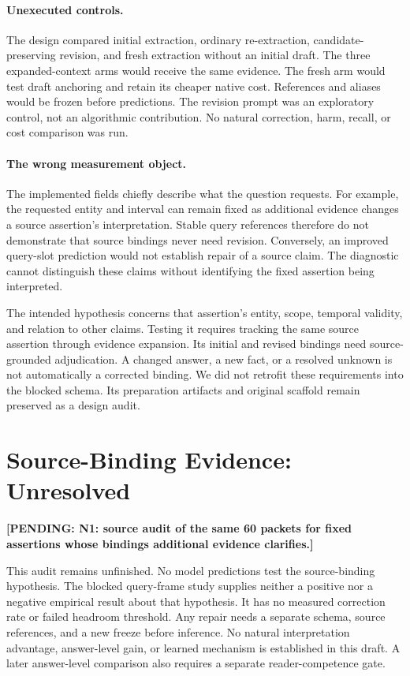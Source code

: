 \documentclass[11pt]{article}
\newcommand{\pending}[1]{\textbf{[PENDING: #1]}}
\begin{document}
\paragraph{Unexecuted controls.}
The design compared initial extraction, ordinary re-extraction, candidate-preserving revision, and fresh extraction without an initial draft.
The three expanded-context arms would receive the same evidence.
The fresh arm would test draft anchoring and retain its cheaper native cost.
References and aliases would be frozen before predictions.
The revision prompt was an exploratory control, not an algorithmic contribution.
No natural correction, harm, recall, or cost comparison was run.

\paragraph{The wrong measurement object.}
The implemented fields chiefly describe what the question requests.
For example, the requested entity and interval can remain fixed as additional evidence changes a source assertion's interpretation.
Stable query references therefore do not demonstrate that source bindings never need revision.
Conversely, an improved query-slot prediction would not establish repair of a source claim.
The diagnostic cannot distinguish these claims without identifying the fixed assertion being interpreted.

The intended hypothesis concerns that assertion's entity, scope, temporal validity, and relation to other claims.
Testing it requires tracking the same source assertion through evidence expansion.
Its initial and revised bindings need source-grounded adjudication.
A changed answer, a new fact, or a resolved unknown is not automatically a corrected binding.
We did not retrofit these requirements into the blocked schema.
Its preparation artifacts and original scaffold remain preserved as a design audit.

\section{Source-Binding Evidence: Unresolved}
\label{sec:pending}

\pending{N1: source audit of the same 60 packets for fixed assertions whose bindings additional evidence clarifies.}

This audit remains unfinished.
No model predictions test the source-binding hypothesis.
The blocked query-frame study supplies neither a positive nor a negative empirical result about that hypothesis.
It has no measured correction rate or failed headroom threshold.
Any repair needs a separate schema, source references, and a new freeze before inference.
No natural interpretation advantage, answer-level gain, or learned mechanism is established in this draft.
A later answer-level comparison also requires a separate reader-competence gate.
\end{document}
